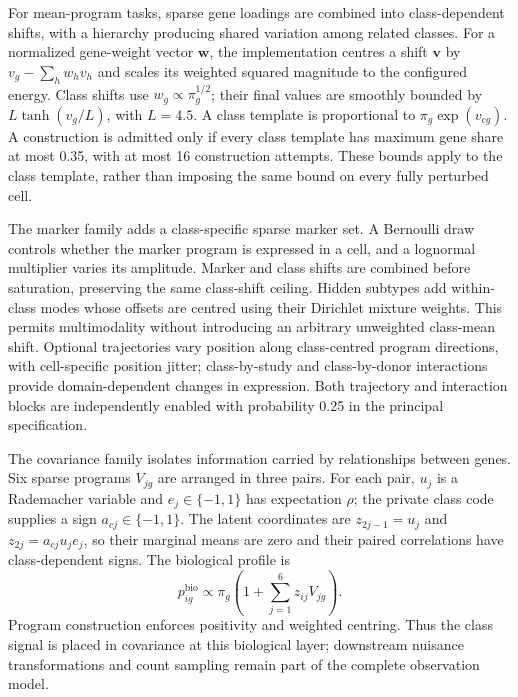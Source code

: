 For mean-program tasks, sparse gene loadings are combined into class-dependent shifts, with a hierarchy producing shared variation among related classes. For a normalized gene-weight vector $\boldsymbol w$, the implementation centres a shift $\boldsymbol v$ by $v_g-\sum_h w_hv_h$ and scales its weighted squared magnitude to the configured energy. Class shifts use $w_g\propto\pi_g^{1/2}$; their final values are smoothly bounded by $L\tanh(v_g/L)$, with $L=4.5$. A class template is proportional to $\pi_g\exp(v_{cg})$. A construction is admitted only if every class template has maximum gene share at most 0.35, with at most 16 construction attempts. These bounds apply to the class template, rather than imposing the same bound on every fully perturbed cell.

The marker family adds a class-specific sparse marker set. A Bernoulli draw controls whether the marker program is expressed in a cell, and a lognormal multiplier varies its amplitude. Marker and class shifts are combined before saturation, preserving the same class-shift ceiling. Hidden subtypes add within-class modes whose offsets are centred using their Dirichlet mixture weights. This permits multimodality without introducing an arbitrary unweighted class-mean shift. Optional trajectories vary position along class-centred program directions, with cell-specific position jitter; class-by-study and class-by-donor interactions provide domain-dependent changes in expression. Both trajectory and interaction blocks are independently enabled with probability 0.25 in the principal specification.

The covariance family isolates information carried by relationships between genes. Six sparse programs $V_{jg}$ are arranged in three pairs. For each pair, $u_j$ is a Rademacher variable and $e_j\in\{-1,1\}$ has expectation $\rho$; the private class code supplies a sign $a_{cj}\in\{-1,1\}$. The latent coordinates are $z_{2j-1}=u_j$ and $z_{2j}=a_{cj}u_je_j$, so their marginal means are zero and their paired correlations have class-dependent signs. The biological profile is
\begin{equation}
 p^{\mathrm{bio}}_{ig}\propto\pi_g\left(1+\sum_{j=1}^{6}z_{ij}V_{jg}\right).
 \label{eq:simulator-covariance}
\end{equation}
Program construction enforces positivity and weighted centring. Thus the class signal is placed in covariance at this biological layer; downstream nuisance transformations and count sampling remain part of the complete observation model.

